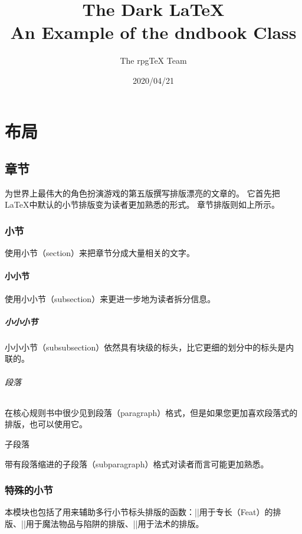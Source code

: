 \documentclass[twocolumn]{ctexbook}
\title{The Dark \LaTeX{} \\
\large An Example of the dndbook Class}
\author{The rpgTeX Team}
\date{2020/04/21}
\begin{document}
\frontmatter

\maketitle

\tableofcontents

\mainmatter

\part{布局}

\chapter{章节}

为世界上最伟大的角色扮演游戏的第五版撰写排版漂亮的文章的。
它首先把\LaTeX{}中默认的小节排版变为读者更加熟悉的形式。
章节排版则如上所示。

\section{小节}
使用小节（section）来把章节分成大量相关的文字。

\subsection{小小节}
使用小小节（subsection）来更进一步地为读者拆分信息。

\subsubsection{小小小节}
小小小节（subsubsection）依然具有块级的标头，比它更细的划分中的标头是内联的。

\paragraph{段落}
在核心规则书中很少见到段落（paragraph）格式，但是如果您更加喜欢段落式的排版，也可以使用它。

\subparagraph{子段落}
带有段落缩进的子段落（subparagraph）格式对读者而言可能更加熟悉。

\section{特殊的小节}

本模块也包括了用来辅助多行小节标头排版的函数：|\DndFeatHeader|用于专长（Feat）的排版、|\DndItemHeader|用于魔法物品与陷阱的排版、|\DndSpellHeader|用于法术的排版。
\end{document}
